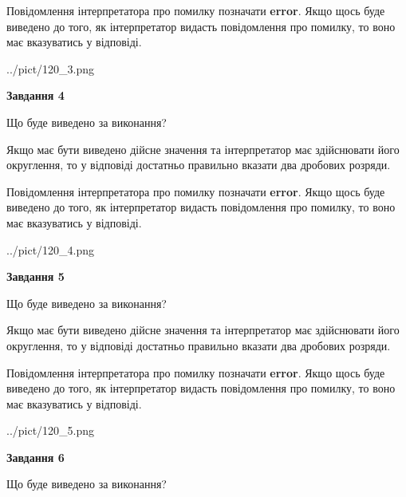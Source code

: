 \documentclass[12pt, ukrainian]{article}
\begin{document}
{\begin {Large}
Повідомлення інтерпретатора про помилку позначати \textbf{error}.
Якщо щось буде виведено до того, як інтерпретатор видасть повідомлення про помилку, 
то воно має вказуватись у відповіді. \par

\begin{center}
	{../pict/120_3.png}
\end{center}
\newpage

{\begin {center}\textbf{Завдання 4}\end {center}}\par
Що буде виведено за виконання? \par

Якщо має бути виведено дійсне значення та інтерпретатор має здійснювати його округлення, 
то у відповіді достатньо правильно вказати два дробових розряди.

Повідомлення інтерпретатора про помилку позначати \textbf{error}.
Якщо щось буде виведено до того, як інтерпретатор видасть повідомлення про помилку, 
то воно має вказуватись у відповіді. \par

\begin{center}
	{../pict/120_4.png}
\end{center}
\newpage

{\begin {center}\textbf{Завдання 5}\end {center}}\par
Що буде виведено за виконання? \par

Якщо має бути виведено дійсне значення та інтерпретатор має здійснювати його округлення, 
то у відповіді достатньо правильно вказати два дробових розряди.

Повідомлення інтерпретатора про помилку позначати \textbf{error}.
Якщо щось буде виведено до того, як інтерпретатор видасть повідомлення про помилку, 
то воно має вказуватись у відповіді. \par

\begin{center}
	{../pict/120_5.png}
\end{center}
\newpage

{\begin {center}\textbf{Завдання 6}\end {center}}\par
Що буде виведено за виконання? \par


\end{Large}}
\end{document}

